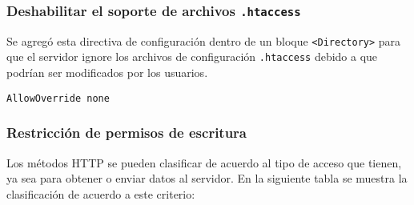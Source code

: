 {
 \begin{table}[H]
 \caption{Directivas de seguridad de \textsc{PHP}}{}
 \noindent{} %
 \end{table}
}

        \subsubsection{Deshabilitar el soporte de archivos \texttt{.htaccess}}

Se agreg\'{o} esta directiva de configuraci\'{o}n dentro de un bloque \texttt{<Directory>} para que el servidor ignore los archivos de configuraci\'{o}n \texttt{.htaccess} debido a que podr\'{i}an ser modificados por los usuarios.

{
\scriptsize
\linespread{1}
\begin{verbatim}
AllowOverride none
\end{verbatim}
}

        \subsubsection{Restricci\'{o}n de permisos de escritura}

Los m\'{e}todos \textsc{HTTP} se pueden clasificar de acuerdo al tipo de acceso que tienen, ya sea para obtener o enviar datos al servidor. En la siguiente tabla se muestra la clasificaci\'{o}n de acuerdo a este criterio:

